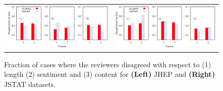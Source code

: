 % 

\begin{figure}
\centering
\begin{tabular}{cc}
\includegraphics[scale = 0.26]{./texfiles/Chapter_4/cikm_17/figures/jhep_all.eps} & \includegraphics[scale = 0.26]{./texfiles/Chapter_4/cikm_17/figures/jstat_all.eps}
\end{tabular}
\caption{\label{disagree:jhep} Fraction of cases where the reviewers disagreed with respect to (1) length (2) sentiment and (3) content for {\bf(Left)} JHEP and {\bf(Right)} JSTAT 
  datasets.}
  \vspace{4mm}
\end{figure}  


